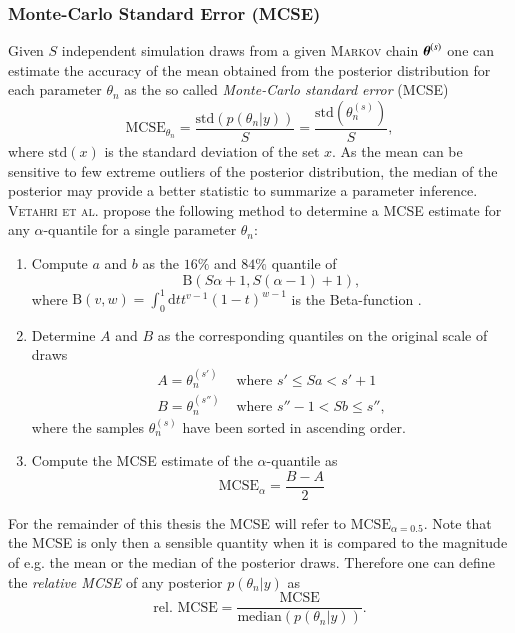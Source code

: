 \subsubsection{Monte-Carlo Standard Error (MCSE)}
Given $S$ independent simulation draws from a given \textsc{Markov} chain $\boldsymbol{\theta}^{(s)}$ one can estimate the accuracy of the mean obtained from the posterior distribution for each parameter $\theta_n$ as the so called \emph{Monte-Carlo standard error} (MCSE) 
\begin{equation}
	\text{MCSE}_{\theta_n}=\frac{\text{std}(p(\theta_n|y))}{S}=\frac{\text{std}(\theta_n^{(s)})}{S},
\end{equation}
where $\text{std}(x)$ is the standard deviation of the set $x$. As the mean can be sensitive to few extreme outliers of the posterior distribution, the median of the posterior may provide a better statistic to summarize a parameter inference. \textsc{Vetahri et al.} \cite{rhat} propose the following method to determine a MCSE estimate for any $\alpha$-quantile for a single parameter $\theta_n$:
\begin{enumerate}
	\item Compute $a$ and $b$ as the $16\%$ and $84\%$ quantile of 
	\begin{equation}
		\text{B}(S\alpha+1,S(\alpha-1)+1),
	\end{equation}
	where $\text{B}(v,w)=\int_{0}^{1}\text{d}t t^{v-1}(1-t)^{w-1}$ is the Beta-function \cite{math}.
	\item Determine $A$ and $B$ as the corresponding quantiles on the original scale of draws
	\begin{align}
		A=\theta_n^{(s')} &\text{ where } s'\leq Sa < s'+1 \\
		B=\theta_n^ {(s'')} &\text{ where } s''-1< Sb\leq s'' ,
	\end{align}
where the samples $\theta_n^{(s)}$ have been sorted in ascending order.
	\item Compute the MCSE estimate of the $\alpha$-quantile as
	\begin{equation}
		\text{MCSE}_{\alpha}=\frac{B-A}{2}
	\end{equation}
\end{enumerate}
For the remainder of this thesis the MCSE will refer to $\text{MCSE}_{\alpha=0.5}$. Note that the MCSE is only then a sensible quantity when it is compared to the magnitude of e.g. the mean or the median of the posterior draws. Therefore one can define the \emph{relative MCSE} of any posterior $p(\theta_n|y)$ as \begin{equation}
	\text{rel. MCSE} = \frac{\text{MCSE}}{\text{median}(p(\theta_n|y))}.
\end{equation}

